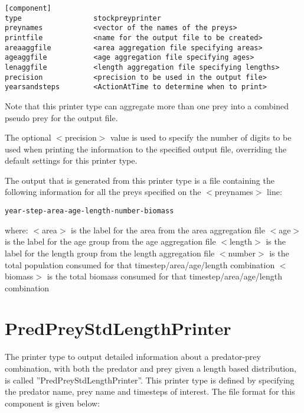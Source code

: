 \documentclass[10pt,twoside]{book}
\begin{document}
{\small\begin{verbatim}
[component]
type                 stockpreyprinter
preynames            <vector of the names of the preys>
printfile            <name for the output file to be created>
areaaggfile          <area aggregation file specifying areas>
ageaggfile           <age aggregation file specifying ages>
lenaggfile           <length aggregation file specifying lengths>
precision            <precision to be used in the output file>
yearsandsteps        <ActionAtTime to determine when to print>
\end{verbatim}}

Note that this printer type can aggregate more than one prey into a combined pseudo prey for the output file.

\bigskip
The optional $<$precision$>$ value is used to specify the number of digits to be used when printing the information to the specified output file, overriding the default settings for this printer type.

\bigskip
The output that is generated from this printer type is a file containing the following information for all the preys specified on the $<$preynames$>$ line:

{\small\begin{verbatim}
year-step-area-age-length-number-biomass
\end{verbatim}}

where:\newline
$<$area$>$ is the label for the area from the area aggregation file\newline
$<$age$>$ is the label for the age group from the age aggregation file\newline
$<$length$>$ is the label for the length group from the length aggregation file\newline
$<$number$>$ is the total population consumed for that timestep/area/age/length combination\newline
$<$biomass$>$ is the total biomass consumed for that timestep/area/age/length combination

\section{PredPreyStdLengthPrinter}\label{sec:predpreystdlengthprinter}
The printer type to output detailed information about a predator-prey combination, with both the predator and prey given a length based distribution, is called ''PredPreyStdLengthPrinter''.  This printer type is defined by specifying the predator name, prey name and timesteps of interest.  The file format for this component is given below:
\end{document}

